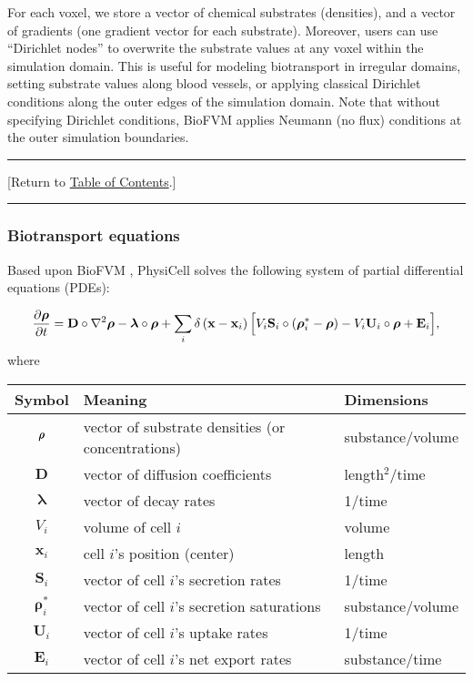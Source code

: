 \documentclass[12pt]{article}
\renewcommand{\vec}[1]{\mathbf{#1}}
\newcommand{\beq}{\begin{equation}}
\newcommand{\eeq}{\end{equation}}
\newcommand{\boldrho}{\rho\hspace{-5.1pt}\rho}
\newcommand{\grvec}[1]{\boldsymbol{#1}}
\newcommand{\TOClink}{\begin{center}\hrule\vskip-5pt\phantom{.}\hfill[Return to \hyperlink{TOC}{Table of Contents}.]\hfill\phantom{.}\vskip3pt\hrule\end{center}}
\begin{document}
For each voxel, we store a vector of chemical substrates (densities), and a vector of gradients (one 
gradient vector for each substrate). Moreover, users can use ``Dirichlet nodes'' to overwrite the 
substrate values at any voxel within the simulation domain. This is useful for modeling biotransport 
in irregular domains, setting substrate values along blood vessels, or applying classical Dirichlet conditions 
along the outer edges of the simulation domain. Note that without specifying Dirichlet conditions, 
BioFVM applies Neumann (no flux) conditions at the outer simulation boundaries. 

\TOClink 

\subsubsection{Biotransport equations}
\label{sec:biotransport_equations}
Based upon BioFVM \cite{ref:BioFVM}, PhysiCell solves the following system of partial differential equations (PDEs):

\beq
\frac{ \partial \grvec{\rho}}{\partial t} 
= \vec{D} \circ \nabla^2 \grvec{\rho} - \grvec{\lambda} \circ \grvec{\rho} + \sum_i \delta \left( \vec{x} - \vec{x}_i \right) 
\Bigl[ V_i \vec{S}_i \circ \left( \grvec{\rho}^*_i - \grvec{\rho} \right) - V_i \vec{U}_i \circ \grvec{\rho} + \vec{E}_i \Bigr], 
\eeq
where 
\begin{center}
\begin{tabular}{c|ll}
\textbf{Symbol} & Meaning & Dimensions\\
\hline \hline 
$\boldrho $ & vector of substrate densities (or concentrations)  & substance/volume \\
 $\vec{D}$ & vector of diffusion coefficients & length$^2$/time  \\
 $\grvec{\lambda}$ & vector of decay rates & 1/time \\ 
 $V_i$ & volume of cell $i$ & volume \\
 $\vec{x}_i$ & cell $i$'s position (center) & length \\
 $\vec{S}_i$ & vector of cell $i$'s secretion rates & 1/time \\
 $\grvec{\rho}^*_i$ & vector of cell $i$'s secretion saturations & substance/volume\\
 $\vec{U}_i$ & vector of cell $i$'s uptake rates & 1/time \\
 $\vec{E}_i$ & vector of cell $i$'s net export rates & substance/time  
\end{tabular}
\end{center}
\end{document}
